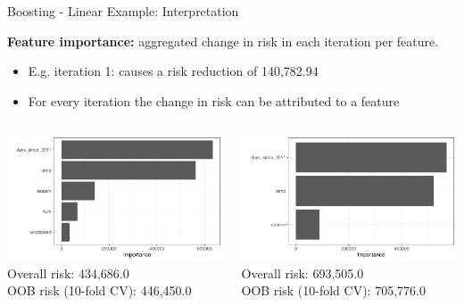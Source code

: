 \documentclass[11pt,compress,t,notes=noshow, aspectratio=169, xcolor=table]{beamer}
\begin{document}
\begin{frame}{Boosting - Linear Example: Interpretation}

\medskip
\textbf{Feature importance:} aggregated change in risk in each iteration per feature. 
\begin{itemize}
    \item E.g. iteration 1:  causes a risk reduction of 140,782.94
    \item For every iteration the change in risk can be attributed to a feature
\end{itemize}
\medskip

\begin{columns}[T, totalwidth=\linewidth]
\begin{column}{0.47\linewidth}
\includegraphics[width = \linewidth]{figure/compboost_pfi_base2.pdf}\\
\centering \scriptsize
Overall risk: 434,686.0 \\
OOB risk (10-fold CV): 446,450.0
\end{column}


\begin{column}{0.47\linewidth}
\includegraphics[width = \linewidth]{figure/compboost_pfi_base1.pdf}\\
\centering \scriptsize
Overall risk: 693,505.0\\
OOB risk (10-fold CV): 705,776.0
\end{column}
\end{columns}


\end{frame}
\end{document}

